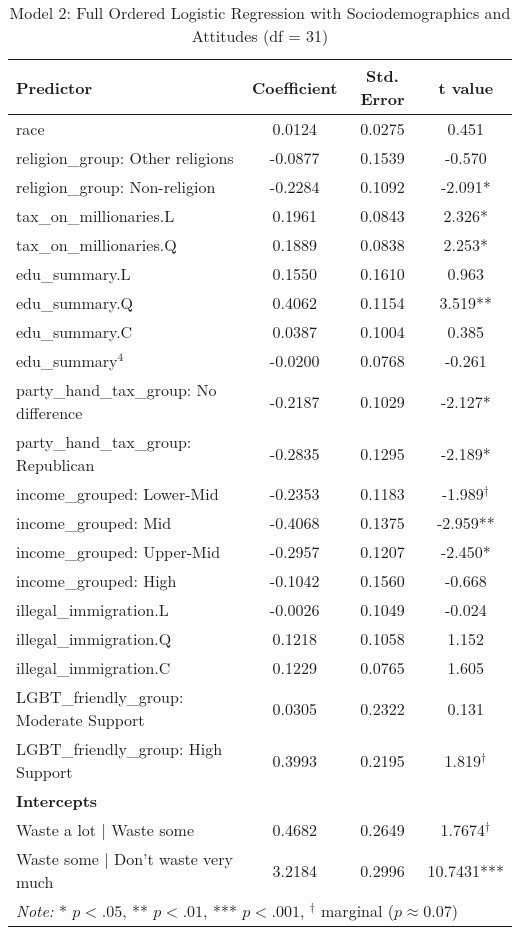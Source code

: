 \documentclass{article}
\begin{document}
\begin{table}[H]
    \centering
    \caption{Model 2: Full Ordered Logistic Regression with Sociodemographics and Attitudes (df = 31)}
    \begin{tabular}{lccc}
    \hline
    \textbf{Predictor} & \textbf{Coefficient} & \textbf{Std. Error} & \textbf{t value} \\
    \hline
    race & 0.0124 & 0.0275 & 0.451 \\
    religion\_group: Other religions & -0.0877 & 0.1539 & -0.570 \\
    religion\_group: Non-religion & -0.2284 & 0.1092 & -2.091* \\
    tax\_on\_millionaries.L & 0.1961 & 0.0843 & 2.326* \\
    tax\_on\_millionaries.Q & 0.1889 & 0.0838 & 2.253* \\
    edu\_summary.L & 0.1550 & 0.1610 & 0.963 \\
    edu\_summary.Q & 0.4062 & 0.1154 & 3.519** \\
    edu\_summary.C & 0.0387 & 0.1004 & 0.385 \\
    edu\_summary$^4$ & -0.0200 & 0.0768 & -0.261 \\
    party\_hand\_tax\_group: No difference & -0.2187 & 0.1029 & -2.127* \\
    party\_hand\_tax\_group: Republican & -0.2835 & 0.1295 & -2.189* \\
    income\_grouped: Lower-Mid & -0.2353 & 0.1183 & -1.989$^\dagger$ \\
    income\_grouped: Mid & -0.4068 & 0.1375 & -2.959** \\
    income\_grouped: Upper-Mid & -0.2957 & 0.1207 & -2.450* \\
    income\_grouped: High & -0.1042 & 0.1560 & -0.668 \\
    illegal\_immigration.L & -0.0026 & 0.1049 & -0.024 \\
    illegal\_immigration.Q & 0.1218 & 0.1058 & 1.152 \\
    illegal\_immigration.C & 0.1229 & 0.0765 & 1.605 \\
    LGBT\_friendly\_group: Moderate Support & 0.0305 & 0.2322 & 0.131 \\
    LGBT\_friendly\_group: High Support & 0.3993 & 0.2195 & 1.819$^\dagger$ \\
    \hline
    \textbf{Intercepts} & & & \\
    \hline
    Waste a lot $|$ Waste some & 0.4682 & 0.2649 & 1.7674$^\dagger$ \\
    Waste some $|$ Don’t waste very much & 3.2184 & 0.2996 & 10.7431*** \\
    \hline
    \multicolumn{4}{l}{\textit{Note:} * $p < .05$, ** $p < .01$, *** $p < .001$, $^\dagger$ marginal ($p \approx 0.07$)} \\
    \end{tabular}
\end{table}
\end{document}
